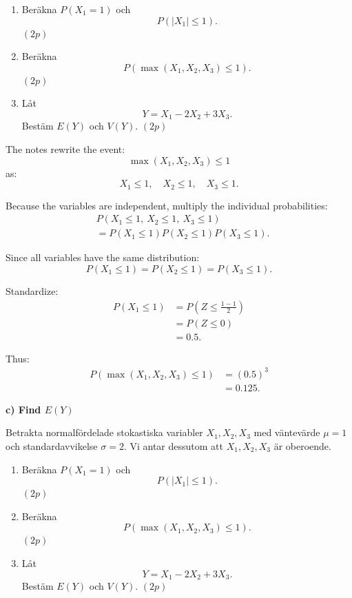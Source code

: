 \documentclass[10pt]{article}
\begin{document}
\begin{enumerate}[label=\alph*)]
\item Beräkna \(P(X_1=1)\) och
\[
P(|X_1|\le 1).
\]
\((2p)\)

\item Beräkna
\[
P(\max(X_1,X_2,X_3)\le 1).
\]
\((2p)\)

\item Låt
\[
Y=X_1-2X_2+3X_3.
\]
Bestäm \(E(Y)\) och \(V(Y)\). \((2p)\)
\end{enumerate}

The notes rewrite the event:
\[
\max(X_1,X_2,X_3)\le 1
\]
as:
\[
X_1\le 1,\quad X_2\le 1,\quad X_3\le 1.
\]

Because the variables are independent, multiply the
individual probabilities:
\begin{align*}
&P(X_1\le 1,\ X_2\le 1,\ X_3\le 1)
\\[2mm]
&=
P(X_1\le 1)
P(X_2\le 1)
P(X_3\le 1).
\end{align*}

Since all variables have the same distribution:
\[
P(X_1\le 1)
=
P(X_2\le 1)
=
P(X_3\le 1).
\]

Standardize:
\begin{align*}
P(X_1\le 1)
&=
P\left(
Z\le
\frac{1-1}{2}
\right)
\\[2mm]
&=
P(Z\le 0)
\\[2mm]
&=
0.5.
\end{align*}

Thus:
\begin{align*}
P(\max(X_1,X_2,X_3)\le 1)
&=
(0.5)^3
\\[2mm]
&=
0.125.
\end{align*}

\textbf{c) Find \(E(Y)\)}

Betrakta normalfördelade stokastiska variabler
\(X_1,X_2,X_3\) med väntevärde \(\mu=1\) och
standardavvikelse \(\sigma=2\). Vi antar dessutom
att \(X_1,X_2,X_3\) är oberoende.

\begin{enumerate}[label=\alph*)]
\item Beräkna \(P(X_1=1)\) och
\[
P(|X_1|\le 1).
\]
\((2p)\)

\item Beräkna
\[
P(\max(X_1,X_2,X_3)\le 1).
\]
\((2p)\)

\item Låt
\[
Y=X_1-2X_2+3X_3.
\]
Bestäm \(E(Y)\) och \(V(Y)\). \((2p)\)
\end{enumerate}
\end{document}
